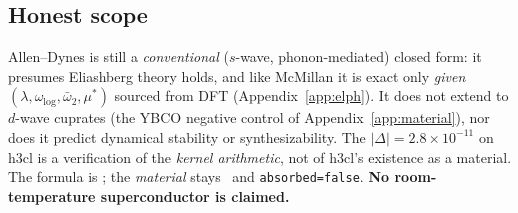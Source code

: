 \subsection{Honest scope}
\label{app:ad-honest}

Allen--Dynes is still a \emph{conventional} ($s$-wave, phonon-mediated)
closed form: it presumes Eliashberg theory holds, and like McMillan it is
exact only \emph{given} $(\lambda, \omega_{\log}, \bar\omega_2, \mu^{*})$
sourced from DFT (Appendix~\ref{app:elph}). It does not extend to $d$-wave
cuprates (the YBCO negative control of Appendix~\ref{app:material}), nor
does it predict dynamical stability or synthesizability. The
$|\Delta|=2.8\times10^{-11}$ on h3cl is a verification of the
\emph{kernel arithmetic}, not of h3cl's existence as a material. The
formula is \tierGreen; the \emph{material} stays \tierOrange\ and
\texttt{absorbed=false}. \textbf{No room-temperature superconductor is
claimed.}
